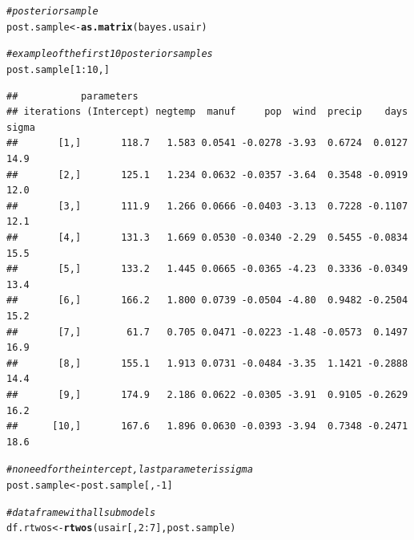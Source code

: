 \documentclass[11pt,a4paper,twoside]{book}
\makeatletter
\newcommand{\hlnum}[1]{\textcolor[rgb]{0.686,0.059,0.569}{#1}}%
\newcommand{\hlcom}[1]{\textcolor[rgb]{0.678,0.584,0.686}{\textit{#1}}}%
\newcommand{\hlopt}[1]{\textcolor[rgb]{0,0,0}{#1}}%
\newcommand{\hlstd}[1]{\textcolor[rgb]{0.345,0.345,0.345}{#1}}%
\newcommand{\hlkwb}[1]{\textcolor[rgb]{0.69,0.353,0.396}{#1}}%
\newcommand{\hlkwd}[1]{\textcolor[rgb]{0.737,0.353,0.396}{\textbf{#1}}}%
\newenvironment{kframe}{%
 \def\at@end@of@kframe{}%
 \ifinner\ifhmode%
  \def\at@end@of@kframe{\end{minipage}}%
  \begin{minipage}{\columnwidth}%
 \fi\fi%
 \def\FrameCommand##1{\hskip\@totalleftmargin \hskip-\fboxsep
 \colorbox{shadecolor}{##1}\hskip-\fboxsep
     \hskip-\linewidth \hskip-\@totalleftmargin \hskip\columnwidth}%
 \MakeFramed {\advance\hsize-\width
   \@totalleftmargin\z@ \linewidth\hsize
   \@setminipage}}%
 {\par\unskip\endMakeFramed%
 \at@end@of@kframe}
\newenvironment{knitrout}{}{} %
\makeatother
\begin{document}
\begin{knitrout}
\begin{kframe}
\begin{alltt}
\hlcom{#posterior sample}
\hlstd{post.sample} \hlkwb{<-} \hlkwd{as.matrix}\hlstd{(bayes.usair)}

\hlcom{#example of the first 10 posterior samples}
\hlstd{post.sample[}\hlnum{1}\hlopt{:}\hlnum{10}\hlstd{,]}
\end{alltt}
\begin{verbatim}
##           parameters
## iterations (Intercept) negtemp  manuf     pop  wind  precip    days sigma
##       [1,]       118.7   1.583 0.0541 -0.0278 -3.93  0.6724  0.0127  14.9
##       [2,]       125.1   1.234 0.0632 -0.0357 -3.64  0.3548 -0.0919  12.0
##       [3,]       111.9   1.266 0.0666 -0.0403 -3.13  0.7228 -0.1107  12.1
##       [4,]       131.3   1.669 0.0530 -0.0340 -2.29  0.5455 -0.0834  15.5
##       [5,]       133.2   1.445 0.0665 -0.0365 -4.23  0.3336 -0.0349  13.4
##       [6,]       166.2   1.800 0.0739 -0.0504 -4.80  0.9482 -0.2504  15.2
##       [7,]        61.7   0.705 0.0471 -0.0223 -1.48 -0.0573  0.1497  16.9
##       [8,]       155.1   1.913 0.0731 -0.0484 -3.35  1.1421 -0.2888  14.4
##       [9,]       174.9   2.186 0.0622 -0.0305 -3.91  0.9105 -0.2629  16.2
##      [10,]       167.6   1.896 0.0630 -0.0393 -3.94  0.7348 -0.2471  18.6
\end{verbatim}
\begin{alltt}
\hlcom{#no need for the intercept, last parameter is sigma}
\hlstd{post.sample} \hlkwb{<-} \hlstd{post.sample[,}\hlopt{-}\hlnum{1}\hlstd{]}

\hlcom{#data frame with all submodels}
\hlstd{df.rtwos} \hlkwb{<-}\hlkwd{rtwos}\hlstd{(usair[,}\hlnum{2}\hlopt{:}\hlnum{7}\hlstd{], post.sample)}


\end{alltt}
\end{kframe}
\end{knitrout}
\end{document}
